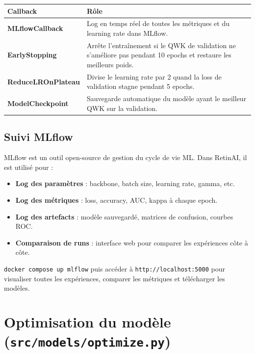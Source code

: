 ﻿\documentclass[11pt,a4paper]{article}
\begin{document}
\begin{center}
\renewcommand{\arraystretch}{1.4}
\begin{tabularx}{\textwidth}{>{\bfseries}lX}
\toprule
Callback & Rôle \\
\midrule
MLflowCallback & Log en temps réel de toutes les métriques et du learning rate dans MLflow. \\
EarlyStopping & Arrête l'entraînement si le QWK de validation ne s'améliore pas pendant 10 epochs et restaure les meilleurs poids. \\
ReduceLROnPlateau & Divise le learning rate par 2 quand la loss de validation stagne pendant 5 epochs. \\
ModelCheckpoint & Sauvegarde automatique du modèle ayant le meilleur QWK sur la validation. \\
\bottomrule
\end{tabularx}
\end{center}

\subsection{Suivi MLflow}

MLflow est un outil open-source de gestion du cycle de vie ML. Dans RetinAI, il est utilisé pour :

\begin{itemize}[leftmargin=2em]
  \item \textbf{Log des paramètres} : backbone, batch size, learning rate, gamma, etc.
  \item \textbf{Log des métriques} : loss, accuracy, AUC, kappa à chaque epoch.
  \item \textbf{Log des artefacts} : modèle sauvegardé, matrices de confusion, courbes ROC.
  \item \textbf{Comparaison de runs} : interface web pour comparer les expériences côte à côte.
\end{itemize}

\begin{tipbox}
\texttt{docker compose up mlflow} puis accéder à \texttt{http://localhost:5000} pour visualiser toutes les expériences, comparer les métriques et télécharger les modèles.
\end{tipbox}

\section{Optimisation du modèle (\texttt{src/models/optimize.py})}
\end{document}
